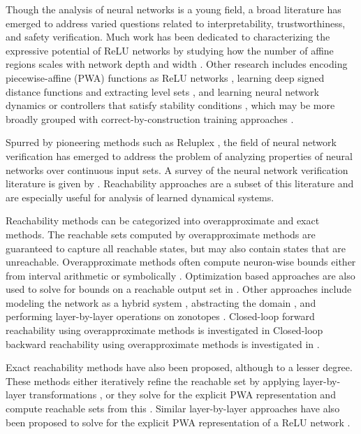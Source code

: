 Though the analysis of neural networks is a young field, a broad literature has emerged to address varied questions related to interpretability, trustworthiness, and safety verification. Much work has been dedicated to characterizing the expressive potential of ReLU networks by studying how the number of affine regions scales with network depth and width \cite{bengio,Hanin_2019,understanding}. Other research includes encoding piecewise-affine (PWA) functions as ReLU networks \cite{fem,reverseengineering}, learning deep signed distance functions and extracting level sets \cite{lei2020analytic}, and learning neural network dynamics or controllers that satisfy stability conditions \cite{zico,jin2020neural}, which may be more broadly grouped with correct-by-construction training approaches \cite{art,lincolnlab}.

Spurred by pioneering methods such as Reluplex \cite{reluplex}, the field of neural network verification has emerged to address the problem of analyzing properties of neural networks over continuous input sets. A survey of the neural network verification literature is given by \cite{survey}. Reachability approaches are a subset of this literature and are especially useful for analysis of learned dynamical systems. 

Reachability methods can be categorized into overapproximate and exact methods. 
The reachable sets computed by overapproximate methods are guaranteed to capture all reachable states, but may also contain states that are unreachable.
Overapproximate methods often compute neuron-wise bounds either from interval arithmetic or symbolically \cite{maxsens,fastlip,reluval,neurify,crown, xiang2020reachable}. Optimization based approaches are also used to solve for bounds on a reachable output set in \cite{sherlock,alessio1,alessio2,proveable}. Other approaches include modeling the network as a hybrid system \cite{verisig}, abstracting the domain \cite{abstract}, and performing layer-by-layer operations on zonotopes \cite{AI2}.
Closed-loop forward reachability using overapproximate methods is investigated in \cite{julian2019reachability, everett, overt, entesari2023automated, meng2022learning, kochdumper2023open}
Closed-loop backward reachability using overapproximate methods is investigated in \cite{rober2023backward, zhang2023backward}.

Exact reachability methods have also been proposed, although to a lesser degree. 
These methods either iteratively refine the reachable set by applying layer-by-layer transformations \cite{xiang2017reachable,nnv,yang2020reachability}, or they solve for the explicit PWA representation and compute reachable sets from this \cite{nnenum, VincentSchwagerICRA21RPM}.
Similar layer-by-layer approaches have also been proposed to solve for the explicit PWA representation of a ReLU network \cite{robinson2020dissecting, hanin2019complexity, xu2022traversing}.

